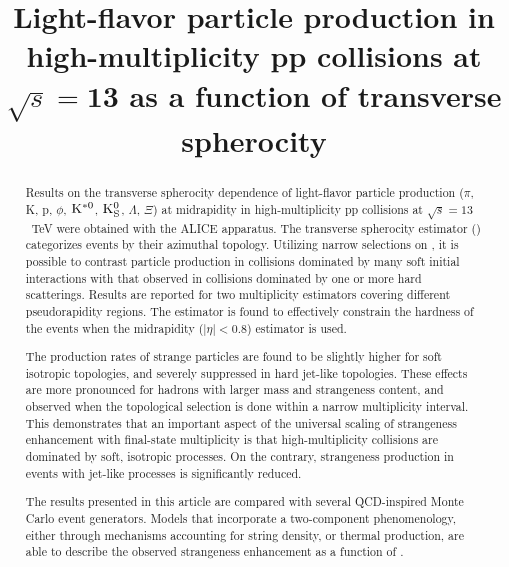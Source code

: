 \documentclass[ALICE,manyauthors]{cernphprep}
\begin{document}


\begin{titlepage}

\title{Light-flavor particle production in high-multiplicity pp collisions at $\mathbf{\sqrt{\textit{s}} = 13}$ \TeV as a function of transverse spherocity}


\begin{abstract}
Results on the transverse spherocity dependence of light-flavor particle production ($\pi$, K, p, $\phi$, ${\rm K^{*0}}$, ${\rm K}^{0}_{\rm{S}}$, $\Lambda$, $\Xi$) at midrapidity in high-multiplicity pp collisions at $\sqrt{s} = 13$~TeV were obtained with the ALICE apparatus. The transverse spherocity estimator (\SOPT) categorizes events by their azimuthal topology. Utilizing narrow selections on \SOPT, it is possible to contrast particle production in collisions dominated by many soft initial interactions with that observed in collisions dominated by one or more hard scatterings. 
Results are reported for two multiplicity estimators covering different pseudorapidity regions.  The \SOPT estimator is found to effectively constrain the hardness of the events when the midrapidity ($\left | \eta \right |< 0.8$) estimator is used. 

The production rates of strange particles are found to be slightly higher for soft isotropic topologies, and severely suppressed in hard jet-like topologies. These effects are more pronounced for hadrons with larger mass and strangeness content, and observed when the topological selection is done within a narrow multiplicity interval. This demonstrates that an important aspect of the universal scaling of strangeness enhancement with final-state multiplicity is that high-multiplicity collisions are dominated by soft, isotropic processes. On the contrary, strangeness production in events with jet-like processes is significantly reduced.

The results presented in this article are compared with several QCD-inspired Monte Carlo event generators. Models that incorporate a two-component phenomenology, either through mechanisms accounting for string density, or thermal production, are able to describe the observed strangeness enhancement as a function of \SOPT. 

\end{abstract}
\end{titlepage}
\end{document}
